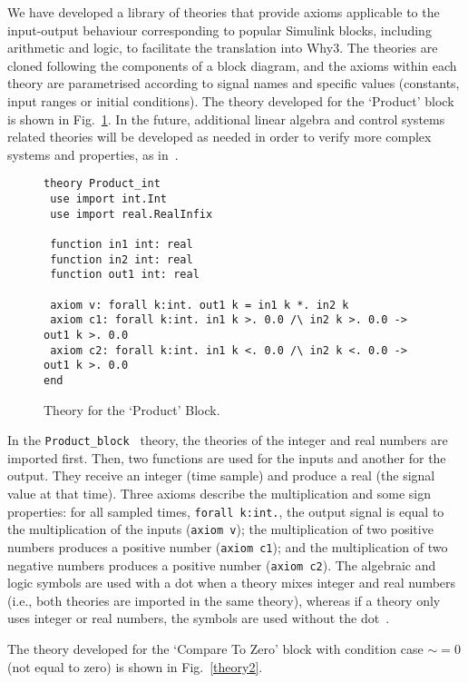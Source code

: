 \documentclass[a4paper]{article}
\begin{document}
We have developed a library of theories that provide axioms applicable to the input-output behaviour corresponding to popular Simulink blocks, including arithmetic and logic, to facilitate the translation into Why3. The theories are cloned following the components of a block diagram, and the axioms within each theory are parametrised according to signal names and specific values (constants, input ranges or initial conditions). The theory developed for the `Product' block is shown in Fig.~\ref{theory}. In the future, additional linear algebra and control systems related theories will be developed as needed in order to verify more complex systems and properties, as in~\cite{Herencia}. 

\begin{figure}[!t]
\begin{center}
\begin{verbatim}
theory Product_int
 use import int.Int  
 use import real.RealInfix
 
 function in1 int: real
 function in2 int: real
 function out1 int: real
 
 axiom v: forall k:int. out1 k = in1 k *. in2 k
 axiom c1: forall k:int. in1 k >. 0.0 /\ in2 k >. 0.0 -> out1 k >. 0.0
 axiom c2: forall k:int. in1 k <. 0.0 /\ in2 k <. 0.0 -> out1 k >. 0.0
end
\end{verbatim}
\end{center}
\caption{Theory for the `Product' Block.}
\label{theory}
\end{figure}

In the \verb+Product_block + theory, the theories of the integer and real numbers are imported first. Then, two functions are used for the inputs and another for the output. They receive an integer (time sample) and produce a real (the signal value at that time). Three axioms describe the multiplication and some sign properties: for all sampled times, \verb+forall k:int.+, the output signal is equal to the multiplication of the inputs (\verb+axiom v+);  the multiplication of two positive numbers produces a positive number (\verb+axiom c1+); and the multiplication of two negative numbers produces a positive number (\verb+axiom c2+). The algebraic and logic symbols are used with a dot when a theory mixes integer and real numbers (i.e., both theories are imported in the same theory), whereas if a theory only uses integer or real numbers, the symbols are used without the dot~\cite{Why3man}. 

The theory developed for the `Compare To Zero' block with condition case $\sim = 0$ (not equal to zero) is shown in Fig.~\ref{theory2}.  
\end{document}
